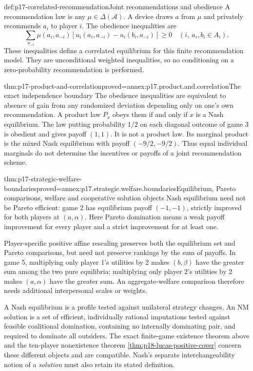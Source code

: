 \begin{hbdefinition}{def:p17-correlated-recommendation}{Joint recommendations and obedience}
A recommendation law is any \(\mu\in\Delta(\mathcal A)\).
A device draws \(a\) from \(\mu\) and privately recommends
\(a_i\) to player \(i\). The obedience inequalities are
\[
 \sum_{a_{-i}}\mu(a_i,a_{-i})
       [u_i(a_i,a_{-i})-u_i(b_i,a_{-i})]\geq0
                          \quad(i,\ a_i,b_i\in A_i).
\]
These inequalities define a correlated equilibrium for this
finite recommendation model. They are unconditional weighted
inequalities, so no conditioning on a zero-probability
recommendation is performed.
\end{hbdefinition}

\begin{hbtheorem}{thm:p17-product-and-correlation}{proved=annex:p17.product.and.correlation}{The exact independence boundary}
The obedience inequalities are equivalent to absence of gain
from any randomized deviation depending only on one's own
recommendation. A product law \(P_x\) obeys them if and only if
\(x\) is a Nash equilibrium.
The law putting probability \(1/2\) on each diagonal outcome
of game 3 is obedient and gives payoff \((1,1)\). It is not
a product law. Its marginal product is the mixed Nash
equilibrium with payoff \((-9/2,-9/2)\).
Thus equal individual marginals do not determine the incentives
or payoffs of a joint recommendation scheme.
\end{hbtheorem}

\begin{hbtheorem}{thm:p17-strategic-welfare-boundaries}{proved=annex:p17.strategic.welfare.boundaries}{Equilibrium, Pareto comparisons, welfare and cooperative solution objects}
Nash equilibrium need not be Pareto efficient: game 2 has
equilibrium payoff \((-1,-1)\), strictly improved for both
players at \((a,\alpha)\).
Here Pareto domination means a weak payoff improvement for
every player and a strict improvement for at least one.

Player-specific positive affine rescaling preserves both the
equilibrium set and Pareto comparisons, but need not preserve
rankings by the sum of payoffs. In game 5, multiplying only
player 1's utilities by 2 makes \((b,\beta)\) have the greater
sum among the two pure equilibria; multiplying only player 2's
utilities by 2 makes \((a,\alpha)\) have the greater sum.
An aggregate-welfare comparison therefore needs additional
interpersonal scales or weights.

A Nash equilibrium is a profile tested against unilateral
strategy changes. An NM solution is a set of efficient,
individually rational imputations tested against feasible
coalitional domination, containing no internally dominating pair,
and required to dominate all outsiders.
The exact finite-game existence theorem above and the
ten-player nonexistence theorem
\cref{thm:p18-lucas-positive-cover} concern these different
objects and are compatible. Nash's separate interchangeability
notion of a \emph{solution} must also retain its stated definition.
\end{hbtheorem}

